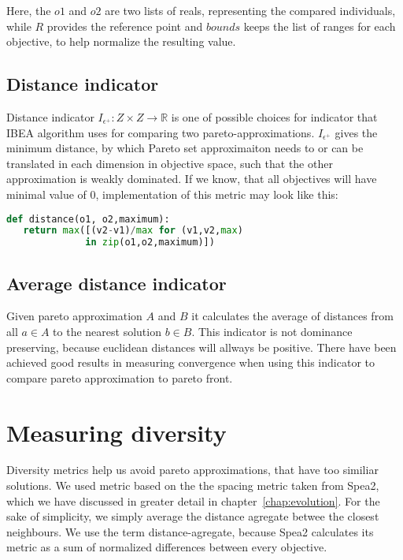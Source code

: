 \documentclass[12pt,oneside]{fithesis2}
\begin{document}
Here, the $o1$ and $o2$ are two lists of reals, representing the compared individuals, while $R$ provides the reference point and $bounds$ keeps the list of ranges for each objective, to help normalize the resulting value.

\subsection{Distance indicator}
Distance indicator $I_{\epsilon^{+}}: Z \times Z \to  \mathbb{R}$ is one of possible choices for indicator that IBEA algorithm uses for comparing two pareto-approximations. $I_{\epsilon^{+}}$ gives the minimum distance, by which Pareto set approximaiton needs to or can be translated in each dimension in objective space, such that the other approximation is weakly dominated. If we know, that all objectives will have minimal value of 0, implementation of this metric may look like this:

\begin{lstlisting}[language=Python,label=eps_example,caption=Distance indicator implementation]
def distance(o1, o2,maximum):
   return max([(v2-v1)/max for (v1,v2,max) 
              in zip(o1,o2,maximum)])
\end{lstlisting}

\subsection{Average distance indicator}
Given pareto approximation $A$ and $B$ it calculates the average of distances from all $a \in A$ to the nearest solution $b \in B$. This indicator is not dominance preserving, because euclidean distances will allways be positive. There have been achieved good results in measuring convergence when using this indicator to compare pareto approximation to pareto front\cite{stehl2013opt}.

\section{Measuring diversity}
Diversity metrics help us avoid pareto approximations, that have too similiar solutions. We used metric based on the the spacing metric taken from Spea2, which we have discussed in greater detail in chapter~\ref{chap:evolution}. For the sake of simplicity, we simply average the distance agregate betwee the closest neighbours. We use the term distance-agregate, because Spea2 calculates its metric as a sum of normalized differences between every objective.
\end{document}
